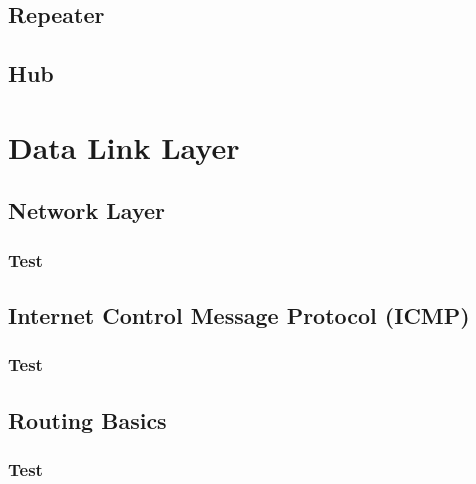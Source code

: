 \documentclass[11pt]{article}
\begin{document}
\subsection{Repeater}
\subsection{Hub}
\section{Data Link Layer}
\subsection{Network Layer}
\subsubsection{Test}
\subsection{Internet Control Message Protocol (ICMP)}
\subsubsection{Test}
\subsection{Routing Basics}
\subsubsection{Test}
\end{document}
